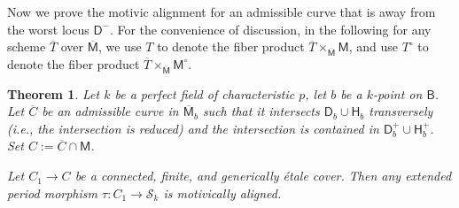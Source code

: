 \documentclass[11pt, letterpaper]{amsart}
\theoremstyle{plain}
\newtheorem{theorem}{Theorem}[section]
\theoremstyle{definition}
\newcommand{\<}{\langle}
\renewcommand{\>}{\rangle}
\newcommand{\shS}{\mathscr{S}}
\newcommand{\sfD}{\mathsf{D}}
\newcommand{\sfM}{\mathsf{M}}
\newcommand{\sfH}{\mathsf{H}}
\newcommand{\sfB}{\mathsf{B}}
\begin{document}

Now we prove the motivic alignment for an admissible curve that is away from the worst locus $\sfD^-$.
For the convenience of discussion, in the following for any scheme $\overline{T}$ over $\overline{\sfM}$, we use $T$ to denote the fiber product $\overline{T}\times_{\overline{\sfM}} \sfM$, and use $T^\circ$ to denote the fiber product $\overline{T}\times_{\overline{\sfM}} \sfM^\circ$.
\begin{theorem}
\label{prop: good points}
    Let $k$ be a perfect field of characteristic $p$, let $b$ be a $k$-point on $\sfB$. 
    Let $\overline{C}$ be an admissible curve in $\overline{\sfM}_b$ such that it intersects $\sfD_{b} \cup \sfH_b$ transversely (i.e., the intersection is reduced) and the intersection is contained in $\sfD^+_b \cup \sfH^+_b$. Set $C := \overline{C} \cap \sfM$. 
      
    Let $C_1\to C$ be a connected, finite, and generically \'etale cover. 
    Then any extended period morphism $\tau : C_1 \to \shS_k$ is motivically aligned. 
\end{theorem}
\end{document}
